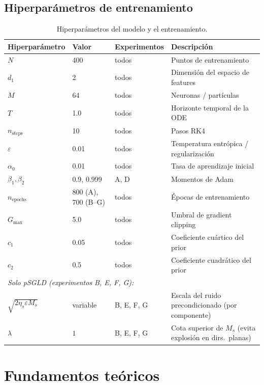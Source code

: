 \documentclass[11pt, a4paper]{article}
\theoremstyle{definition}
\begin{document}
\subsection{Hiperparámetros de entrenamiento}

\begin{table}[H]
\centering
\begin{tabularx}{\textwidth}{l l l X}
\toprule
Hiperparámetro & Valor & Experimentos & Descripción \\
\midrule
$N$ & 400 & todos & Puntos de entrenamiento \\
$d_1$ & 2 & todos & Dimensión del espacio de features \\
$M$ & 64 & todos & Neuronas / partículas \\
$T$ & 1.0 & todos & Horizonte temporal de la ODE \\
$n_\text{steps}$ & 10 & todos & Pasos RK4 \\
$\varepsilon$ & 0.01 & todos & Temperatura entrópica / regularización \\
$\alpha_0$ & 0.01 & todos & Tasa de aprendizaje inicial \\
$\beta_1, \beta_2$ & 0.9, 0.999 & A, D & Momentos de Adam \\
$n_\text{epochs}$ & 800 (A), 700 (B–G) & todos & Épocas de entrenamiento \\
$G_{\max}$ & 5.0 & todos & Umbral de gradient clipping \\
$c_1$ & 0.05 & todos & Coeficiente cuártico del prior \\
$c_2$ & 0.5 & todos & Coeficiente cuadrático del prior \\
\midrule
\multicolumn{4}{l}{\textit{Solo pSGLD (experimentos B, E, F, G):}} \\
$\sqrt{2\eta_s\varepsilon M_s}$ & variable & B, E, F, G & Escala del ruido precondicionado (por componente) \\
$\lambda$ & $1$ & B, E, F, G & Cota superior de $M_s$ (evita explosión en dirs.\ planas) \\
\bottomrule
\end{tabularx}
\caption{Hiperparámetros del modelo y el entrenamiento.}
\end{table}

\section{Fundamentos teóricos}
\label{sec:teoria}
\end{document}
